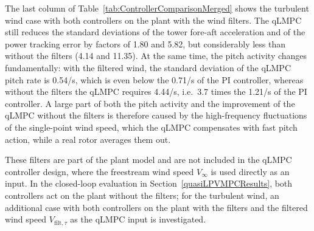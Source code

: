 The last column of Table~\ref{tab:ControllerComparisonMerged} shows the turbulent wind case with both controllers on the plant with the wind filters. The qLMPC still reduces the standard deviations of the tower fore-aft acceleration and of the power tracking error by factors of 1.80 and 5.82, but considerably less than without the filters (4.14 and 11.35). At the same time, the pitch activity changes fundamentally: with the filtered wind, the standard deviation of the qLMPC pitch rate is 0.54\textdegree/s, which is even below the 0.71\textdegree/s of the PI controller, whereas without the filters the qLMPC requires 4.44\textdegree/s, i.e.\ 3.7 times the 1.21\textdegree/s of the PI controller. A large part of both the pitch activity and the improvement of the qLMPC without the filters is therefore caused by the high-frequency fluctuations of the single-point wind speed, which the qLMPC compensates with fast pitch action, while a real rotor averages them out.



These filters are part of the plant model and are not included in the qLMPC controller design, where the freestream wind speed $V_\infty$ is used directly as an input. In the closed-loop evaluation in Section~\ref{quasiLPVMPCResults}, both controllers act on the plant without the filters; for the turbulent wind, an additional case with both controllers on the plant with the filters and the filtered wind speed $V_{\text{filt},\tau}$ as the qLMPC input is investigated.



